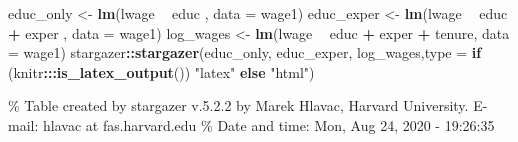 \documentclass[]{book}
\newenvironment{Shaded}{\begin{snugshade}}{\end{snugshade}}
\newcommand{\ControlFlowTok}[1]{\textcolor[rgb]{0.13,0.29,0.53}{\textbf{#1}}}
\newcommand{\DataTypeTok}[1]{\textcolor[rgb]{0.13,0.29,0.53}{#1}}
\newcommand{\KeywordTok}[1]{\textcolor[rgb]{0.13,0.29,0.53}{\textbf{#1}}}
\newcommand{\NormalTok}[1]{#1}
\newcommand{\OperatorTok}[1]{\textcolor[rgb]{0.81,0.36,0.00}{\textbf{#1}}}
\newcommand{\StringTok}[1]{\textcolor[rgb]{0.31,0.60,0.02}{#1}}
\begin{document}
\begin{Shaded}
\begin{Highlighting}[]
\NormalTok{educ_only <-}\StringTok{ }\KeywordTok{lm}\NormalTok{(lwage }\OperatorTok{~}\StringTok{ }\NormalTok{educ                 , }\DataTypeTok{data =}\NormalTok{ wage1)}
\NormalTok{educ_exper <-}\StringTok{ }\KeywordTok{lm}\NormalTok{(lwage }\OperatorTok{~}\StringTok{ }\NormalTok{educ }\OperatorTok{+}\StringTok{ }\NormalTok{exper        , }\DataTypeTok{data =}\NormalTok{ wage1)}
\NormalTok{log_wages <-}\StringTok{ }\KeywordTok{lm}\NormalTok{(lwage }\OperatorTok{~}\StringTok{ }\NormalTok{educ }\OperatorTok{+}\StringTok{ }\NormalTok{exper }\OperatorTok{+}\StringTok{ }\NormalTok{tenure, }\DataTypeTok{data =}\NormalTok{ wage1)}
\NormalTok{stargazer}\OperatorTok{::}\KeywordTok{stargazer}\NormalTok{(educ_only, educ_exper, log_wages,}\DataTypeTok{type =} \ControlFlowTok{if}\NormalTok{ (knitr}\OperatorTok{:::}\KeywordTok{is_latex_output}\NormalTok{()) }\StringTok{"latex"} \ControlFlowTok{else} \StringTok{"html"}\NormalTok{)}
\end{Highlighting}
\end{Shaded}

\% Table created by stargazer v.5.2.2 by Marek Hlavac, Harvard University. E-mail: hlavac at fas.harvard.edu
\% Date and time: Mon, Aug 24, 2020 - 19:26:35
\end{document}
